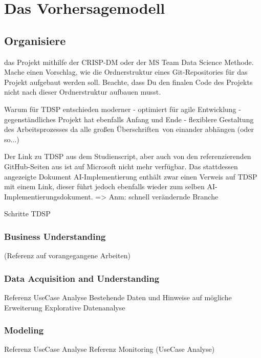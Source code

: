 \chapter{Das Vorhersagemodell}

\section{Organisiere} das Projekt mithilfe der CRISP-DM oder der MS Team Data Science Methode. Mache einen Vorschlag, wie die Ordnerstruktur eines Git-Repositories für das Projekt aufgebaut werden soll. Beachte, dass Du den finalen Code des Projekts nicht nach dieser Ordnerstruktur aufbauen musst. 

Warum für TDSP entschieden
moderner - optimiert für agile Entwicklung - gegenständliches Projekt hat ebenfalls Anfang und Ende - flexiblere Gestaltung des Arbeitsprozesses da alle großen \glqq Überschriften\grqq\ von einander abhängen (oder so...)

Der Link zu TDSP aus dem Studienscript, aber auch von den referenzierenden GitHub-Seiten aus ist auf Microsoft nicht mehr verfügbar. Das stattdessen angezeigte Dokument AI-Implementierung enthält zwar einen Verweis auf TDSP mit einem Link, dieser führt jedoch ebenfalls wieder zum selben AI-Implementierungsdokument. => Anm: schnell verändernde Branche

Schritte TDSP \citep{noauthor_microsoft-tdspdocslifecycle-detailmd_nodate}

\subsection{Business Understanding} (Referenz auf vorangegangene Arbeiten)
\subsection{Data Acquisition and Understanding}
Referenz UseCase Analyse
Bestehende Daten und Hinweise auf mögliche Erweiterung
Explorative Datenanalyse


\subsection{Modeling}
Referenz UseCase Analyse
Referenz Monitoring (UseCase Analyse)




